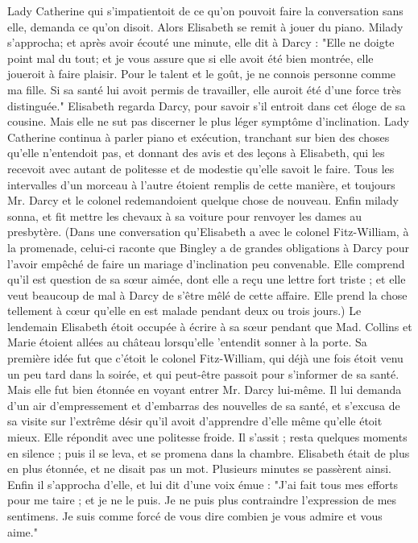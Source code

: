 Lady Catherine qui s'impatientoit de ce qu'on pouvoit faire la conversation sans elle, demanda ce qu'on disoit. Alors Elisabeth se remit à jouer du piano. Milady s'approcha; et après avoir écouté une minute, elle dit à Darcy : "Elle ne doigte point mal du tout; et je vous assure que si elle avoit été bien montrée, elle joueroit à faire plaisir. Pour le talent et le goût, je ne connois personne comme ma fille. Si sa santé lui avoit permis de travailler, elle auroit été d'une force très distinguée."
Elisabeth regarda Darcy, pour savoir s'il entroit dans cet éloge de sa cousine. Mais elle ne sut pas discerner le plus léger symptôme d'incli\-nation. Lady Catherine continua à parler piano et exécution, tranchant sur bien des choses qu'elle n'entendoit pas, et donnant des avis et des leçons à Elisabeth, qui les recevoit avec autant de politesse et de modestie qu'elle savoit le faire. Tous les intervalles d'un morceau à l'autre étoient remplis de cette manière, et toujours Mr. Darcy et le colonel redemandoient quelque\setcounter{page}{546} chose de nouveau. Enfin milady sonna, et fit mettre les chevaux à sa voiture pour renvoyer les dames au presbytère.
(Dans une conversation qu'Elisabeth a avec le colonel Fitz-William, à la promenade, celui-ci raconte que Bingley a de grandes obligations à Darcy pour l'avoir empêché de faire un mariage d'inclination peu convenable. Elle comprend qu'il est question de sa sœur aimée, dont elle a reçu une lettre fort triste ; et elle veut beaucoup de mal à Darcy de s'être mêlé de cette affaire. Elle prend la chose tellement à cœur qu'elle en est malade pendant deux ou trois jours.)
Le lendemain Elisabeth étoit occupée à écrire à sa sœur pendant que Mad. Collins et Marie étoient allées au château lorsqu'elle 'entendit sonner à la porte.
Sa première idée fut que c'étoit le colonel Fitz-William, qui déjà une fois étoit venu un peu tard dans la soirée, et qui peut-être passoit pour s'informer de sa santé. Mais elle fut bien étonnée en voyant entrer Mr. Darcy lui-même. Il lui demanda d'un air d'empressement et d'embarras des nouvelles de sa santé, et s'excusa de sa visite sur l'extrême désir qu'il avoit d'apprendre d'elle même qu'elle étoit mieux. Elle répondit avec une politesse froide. Il s'assit ; resta quelques\setcounter{page}{547} moments en silence ; puis il se leva, et se promena dans la chambre.
Elisabeth était de plus en plus étonnée, et ne disait pas un mot. Plusieurs minutes se passèrent ainsi. Enfin il s'approcha d'elle, et lui dit d'une voix émue : "J'ai fait tous mes efforts pour me taire ; et je ne le puis. Je ne puis plus contraindre l'expression de mes sentimens. Je suis comme forcé de vous dire combien je vous admire et vous aime."
